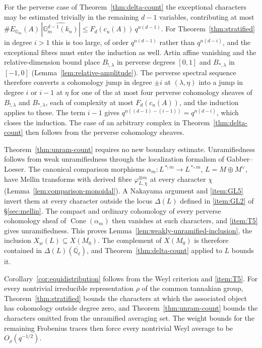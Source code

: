 \documentclass[12pt,reqno]{amsart}
\theoremstyle{definition}
\theoremstyle{plain}
\theoremstyle{definition}
\theoremstyle{remark}
\newcommand{\bbG}{\mathbb{G}}  \newcommand{\bbH}{\mathbb{H}}
\newcommand{\bbQ}{\mathbb{Q}}  \newcommand{\bbR}{\mathbb{R}}
\newcommand{\ol}[1]{\overline{#1}}
\newcommand{\Ql}{\bbQ_{\ell}}
\newcommand{\Gm}{\bbG_m}
\newcommand{\cu}{c_u}
\newcommand{\Cone}{\operatorname{Cone}}
\begin{document}
For the perverse case of Theorem~\ref{thm:delta-count} the exceptional characters may be estimated
trivially in the remaining \(d-1\) variables, contributing at most
\(\#E_{\Gm}(A)\,|\widehat{\Gm^{d-1}(k_n)}|\le F_d(\cu(A))\,q^{n(d-1)}\).  For
Theorem~\ref{thm:stratified} in degree \(i>1\) this is too large, of order \(q^{n(d-1)}\) rather than
\(q^{n(d-i)}\), and the exceptional fibres must enter the induction as well.  Artin affine vanishing
and the relative-dimension bound place \(B_{!,\lambda}\) in perverse degrees \([0,1]\) and
\(B_{*,\lambda}\) in \([-1,0]\) (Lemma~\ref{lem:relative-amplitude}).  The perverse spectral sequence
therefore converts a cohomology jump in degree \(\pm i\) at \((\lambda,\eta)\) into a jump in degree
\(i\) or \(i-1\) at \(\eta\) for one of the at most four perverse cohomology sheaves of
\(B_{!,\lambda}\) and \(B_{*,\lambda}\), each of complexity at most \(F_d(\cu(A))\), and the
induction applies to these.  The term \(i-1\) gives \(q^{n((d-1)-(i-1))}=q^{n(d-i)}\), which closes
the induction.  The case of an arbitrary complex in Theorem~\ref{thm:delta-count} then follows from
the perverse cohomology sheaves.

Theorem~\ref{thm:unram-count} requires no new boundary estimate.  Unramifiedness follows from weak
unramifiedness through the localization formalism of Gabber--Loeser.  The canonical comparison
morphisms \(\alpha_m\colon L^{\ast_!m}\to L^{\ast_*m}\), \(L=M\oplus M^\vee\), have Mellin transforms
with derived fibre \(\varphi_{L,\chi}^{\otimes m}\) at every character \(\chi\)
(Lemma~\ref{lem:comparison-monoidal}).  A Nakayama argument and \ref{item:GL5} invert them at every
character outside the locus \(\Delta(L)\) defined in \ref{item:GL2} of \S\ref{sec:mellin}.  The
compact and ordinary cohomology of every perverse cohomology sheaf of \(\Cone(\alpha_m)\) then
vanishes at such characters, and \ref{item:T5} gives unramifiedness.  This proves
Lemma~\ref{lem:weakly-unramified-inclusion}, the inclusion \(X_w(L)\subseteq X(M_0)\).  The
complement of \(X(M_0)\) is therefore contained in \(\Delta(L)(\ol\Ql)\), and
Theorem~\ref{thm:delta-count} applied to \(L\) bounds it.

Corollary~\ref{cor:equidistribution} follows from the Weyl criterion and \ref{item:T5}.  For every
nontrivial irreducible representation \(\rho\) of the common tannakian group,
Theorem~\ref{thm:stratified} bounds the characters at which the associated object has cohomology
outside degree zero, and Theorem~\ref{thm:unram-count} bounds the characters omitted from the
unramified averaging set.  The weight bounds for the remaining Frobenius traces then force every
nontrivial Weyl average to be \(O_\rho(q^{-1/2})\).
\end{document}
